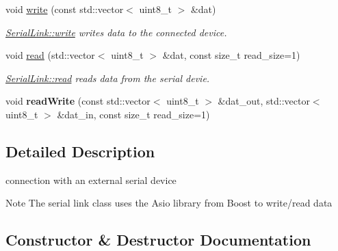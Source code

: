 \begin{DoxyCompactItemize}
\item 
void \mbox{\hyperlink{class_serial_link_af0e94df5c46bb1b89f2b79eda8312fde}{write}} (const std\+::vector$<$ uint8\+\_\+t $>$ \&dat)
\begin{DoxyCompactList}\small\item\em \mbox{\hyperlink{class_serial_link_af0e94df5c46bb1b89f2b79eda8312fde}{Serial\+Link\+::write}} writes data to the connected device. \end{DoxyCompactList}\item 
void \mbox{\hyperlink{class_serial_link_a2f83d397031c69640346fd69a44364d0}{read}} (std\+::vector$<$ uint8\+\_\+t $>$ \&dat, const size\+\_\+t read\+\_\+size=1)
\begin{DoxyCompactList}\small\item\em \mbox{\hyperlink{class_serial_link_a2f83d397031c69640346fd69a44364d0}{Serial\+Link\+::read}} reads data from the serial devie. \end{DoxyCompactList}\item 
\mbox{\label{class_serial_link_af008ff3fcb4f725210edbed4430d2cf3}} 
void {\bfseries read\+Write} (const std\+::vector$<$ uint8\+\_\+t $>$ \&dat\+\_\+out, std\+::vector$<$ uint8\+\_\+t $>$ \&dat\+\_\+in, const size\+\_\+t read\+\_\+size=1)
\end{DoxyCompactItemize}


\subsection{Detailed Description}
connection with an external serial device \begin{DoxyNote}{Note}
The serial link class uses the Asio library from Boost to write/read data 
\end{DoxyNote}


\subsection{Constructor \& Destructor Documentation}
\mbox{\label{class_serial_link_a96aca1c125f24688b57b6fde3fbc4f6d}} 
